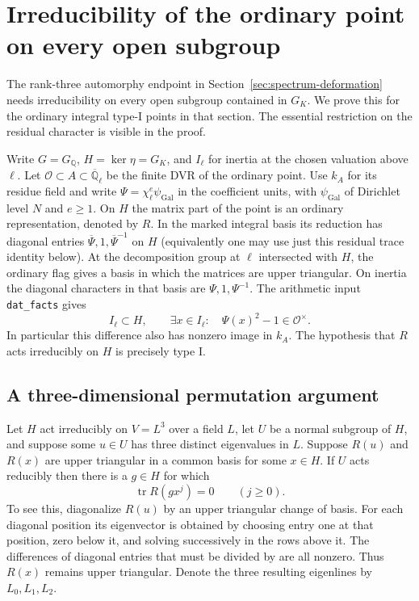 \section{Irreducibility of the ordinary point on every open subgroup}
\label{sec:spectrum-open-irreducibility}

The rank-three automorphy endpoint in
Section~\ref{sec:spectrum-deformation} needs irreducibility on every
open subgroup contained in $G_K$. We prove this for the ordinary
integral type-I points in that section. The essential restriction on
the residual character is visible in the proof.

Write $G=G_{\mathbb Q}$, $H=\ker\eta=G_K$, and $I_\ell$ for inertia at
the chosen valuation above $\ell$. Let $\mathcal O\subset A\subset
\overline{\mathbb Q}_\ell$ be the finite DVR of the ordinary point. Use
$k_A$ for its residue field and write
$\Psi=\chi_\ell^e\psi_{\mathrm{Gal}}$ in the coefficient units, with
$\psi_{\mathrm{Gal}}$ of Dirichlet level $N$ and $e\ge1$. On $H$ the
matrix part of the point is an ordinary representation, denoted by
$R$. In the marked integral basis its reduction has diagonal entries
$\overline\Psi,1,\overline\Psi^{-1}$ on $H$ (equivalently one may
use just this residual trace identity below). At the decomposition
group at $\ell$ intersected with $H$, the ordinary flag gives a
basis in which the matrices are upper triangular. On inertia the
diagonal characters in that basis are $\Psi,1,\Psi^{-1}$.
The arithmetic input \texttt{dat\_facts} gives
\begin{equation}
 I_\ell\subset H,\qquad
 \exists x\in I_\ell:\quad \Psi(x)^2-1\in\mathcal O^\times .
 \label{eq:open-residue-separation}
\end{equation}
In particular this difference also has nonzero image in $k_A$.
The hypothesis that $R$ acts irreducibly on $H$ is precisely type I.

\subsection{A three-dimensional permutation argument}

Let $H$ act irreducibly on $V=L^3$ over a field $L$, let $U$ be a
normal subgroup of $H$, and suppose some $u\in U$ has three distinct
eigenvalues in $L$. Suppose $R(u)$ and $R(x)$ are upper triangular
in a common basis for some $x\in H$. If $U$ acts reducibly then there
is a $g\in H$ for which
\begin{equation}
               \operatorname{tr} R(gx^j)=0\qquad(j\ge0).
 \label{eq:open-vanishing-coset}
\end{equation}
To see this, diagonalize $R(u)$ by an upper triangular change of
basis. For each diagonal position its eigenvector is obtained by
choosing entry one at that position, zero below it, and solving
successively in the rows above it. The differences of diagonal
entries that must be divided by are all nonzero. Thus $R(x)$
remains upper triangular. Denote the three resulting eigenlines
by $L_0,L_1,L_2$.

